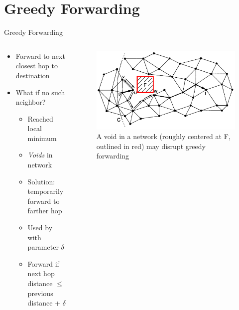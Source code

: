 \documentclass[pdftex]{beamer}
\begin{document}

\section{Greedy Forwarding}


\begin{frame}{Greedy Forwarding}
\begin{columns}
\begin{column}{.5\textwidth}
\begin{itemize}
	\item Forward to next closest hop to destination
	\item What if no such neighbor?
	\begin{itemize}
		\item Reached local minimum
		\item \emph{Voids} in network 
		\item Solution: temporarily forward to farther hop
		\item Used by \cite{Ko98location-aidedrouting, 749282} with parameter $\delta$
		\item Forward if next hop distance $\leq$ previous distance + $\delta$
	\end{itemize}
\end{itemize}
\end{column}

\begin{column}{.5\textwidth}
\begin{figure}
\includegraphics[width=\textwidth]{void}
\caption{A void in a network (roughly centered at F, outlined in red) may disrupt greedy forwarding}
\end{figure}
\end{column}
\end{columns}
\end{frame}
\end{document}
